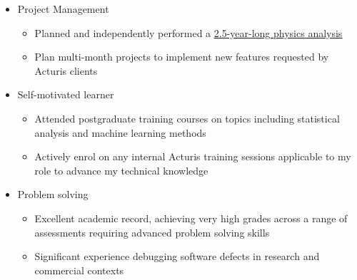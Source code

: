 \documentclass[a4paper]{article}
\newcommand\link[2]{{\color{hl}\uline{\href{#1}{#2}}}}
\newcommand\intersectionspacing{0.3em}
\newcommand\thesislink[1]{https://raw.githubusercontent.com/Hazza4569/thesis/refs/heads/master/thesis.pdf\#page=#1}
\begin{document}
{\begin{itemize}
\begin{itemize}
          but also block out time to progress projects
      \end{itemize}
      \item Project Management
      \begin{itemize}
        \item Planned and independently performed a
          \link{\thesislink{150}}{2.5-year-long physics analysis}
        \item Plan multi-month projects to implement new features requested by
          Acturis clients
      \end{itemize}
      \item Self-motivated learner
      \begin{itemize}
        \item Attended postgraduate training courses on topics including
          statistical analysis and machine learning methods
        \item Actively enrol on any internal Acturis training sessions
          applicable to my role to advance my technical knowledge
      \end{itemize}
      \item Problem solving
      \begin{itemize}
        \item Excellent academic record, achieving very high grades across a
          range of assessments requiring advanced problem solving skills
        \item Significant experience debugging software defects in research
          and commercial contexts
      \end{itemize}
    \end{itemize}
}\\[\intersectionspacing]%
\end{document}
